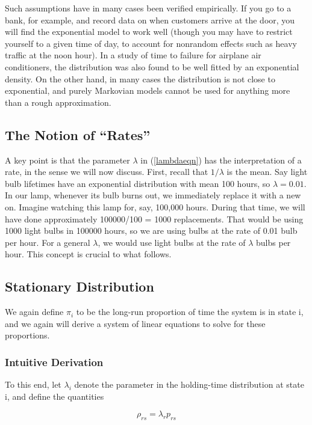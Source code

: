 Such assumptions have in many cases been verified empirically. If you go to
a bank, for example, and record data on when customers arrive at the
door, you will find the exponential model to work well (though you may
have to restrict yourself to a given time of day, to account for
nonrandom effects such as heavy traffic at the noon hour). In a study of
time to failure for airplane air conditioners, the distribution was also
found to be well fitted by an exponential density.  On the other hand,
in many cases the distribution is not close to exponential, and purely
Markovian models cannot be used for anything more than a rough
approximation.

\subsection{The Notion of ``Rates''}
\label{rates}

A key point is that the parameter $\lambda$ in (\ref{lambdaeqn}) has the
interpretation of a rate, in the sense we will now discuss.  First,
recall that $1/\lambda$ is the mean.  Say light bulb lifetimes have an
exponential distribution with mean 100 hours, so $\lambda = 0.01$.  In
our lamp, whenever its bulb burns out, we immediately replace it with a
new on.  Imagine watching this lamp for, say, 100,000 hours.  During
that time, we will have done approximately 100000/100 = 1000
replacements.  That would be using 1000 light bulbs in 100000 hours, so
we are using bulbs at the rate of 0.01 bulb per hour.  For a general
$\lambda$, we would use light bulbs at the rate of $\lambda$ bulbs per
hour.  This concept is crucial to what follows.

\subsection{Stationary Distribution}

We again define $\pi_{i}$ to be the long-run proportion of time the
system is in state i, and we again will derive a system of linear
equations to solve for these proportions. 

\subsubsection{Intuitive Derivation}

To this end, let $\lambda_{i}$ denote the parameter in the
holding-time distribution at state i, and define the
quantities 

\begin{equation}
\label{rhors}
\rho_{rs} = \lambda_r p_{rs}
\end{equation}

